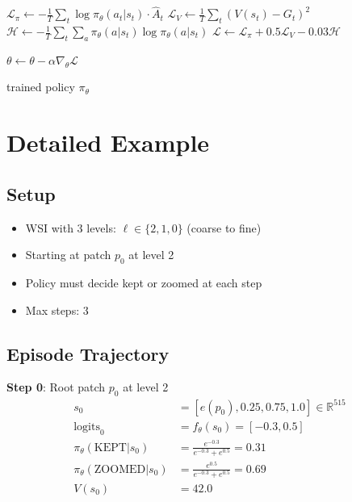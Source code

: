 \documentclass[11pt]{article}
\begin{document}
\begin{algorithm}
\begin{algorithmic}[1]
            \State {}
            \State $\mathcal{L}_\pi \gets -\frac{1}{T} \sum_t \log \pi_\theta(a_t|s_t) \cdot \hat{A}_t$
            \State $\mathcal{L}_V \gets \frac{1}{T} \sum_t (V(s_t) - G_t)^2$
            \State $\mathcal{H} \gets -\frac{1}{T} \sum_t \sum_a \pi_\theta(a|s_t) \log \pi_\theta(a|s_t)$
            \State $\mathcal{L} \gets \mathcal{L}_\pi + 0.5 \mathcal{L}_V - 0.03 \mathcal{H}$
            
            \State {}
            \State $\theta \gets \theta - \alpha \nabla_\theta \mathcal{L}$ 
            
        \EndFor
    \EndFor
\EndFor

\State \Return trained policy $\pi_\theta$
\end{algorithmic}
\end{algorithm}

\section{Detailed Example}

\subsection{Setup}
\begin{itemize}[nosep]
    \item WSI with 3 levels: $\ell \in \{2, 1, 0\}$ (coarse to fine)
    \item Starting at patch $p_0$ at level 2
    \item Policy must decide kept or zoomed at each step
    \item Max steps: 3
\end{itemize}

\subsection{Episode Trajectory}

\textbf{Step 0}: Root patch $p_0$ at level 2
\begin{align}
s_0 &= [e(p_0), 0.25, 0.75, 1.0] \in \mathbb{R}^{515} \\
\text{logits}_0 &= f_\theta(s_0) = [-0.3, 0.5] \\
\pi_\theta(\text{KEPT}|s_0) &= \frac{e^{-0.3}}{e^{-0.3} + e^{0.5}} = 0.31 \\
\pi_\theta(\text{ZOOMED}|s_0) &= \frac{e^{0.5}}{e^{-0.3} + e^{0.5}} = 0.69 \\
V(s_0) &= 42.0
\end{align}
\end{document}
